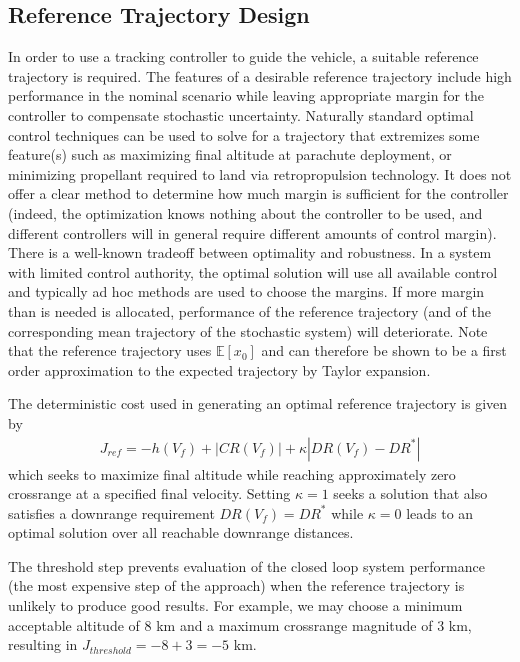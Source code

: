 \documentclass[10pt,a4paper]{article}
\begin{document}
		

	\subsection{Reference Trajectory Design}
	In order to use a tracking controller to guide the vehicle, a suitable reference trajectory is required. The features of a desirable reference trajectory include high performance in the nominal scenario while leaving appropriate margin for the controller to compensate stochastic uncertainty. Naturally standard optimal control techniques can be used to solve for a trajectory that extremizes some feature(s) such as maximizing final altitude at parachute deployment, or minimizing propellant required to land via retropropulsion technology. It does not offer a clear method to determine how much margin is sufficient for the controller (indeed, the optimization knows nothing about the controller to be used, and different controllers will in general require different amounts of control margin). There is a well-known tradeoff between optimality and robustness. In a system with limited control authority, the optimal solution will use all available control and typically ad hoc methods are used to choose the margins. If more margin than is needed is allocated, performance of the reference trajectory (and of the corresponding mean trajectory of the stochastic system) will deteriorate. Note that the reference trajectory uses $ \mathbb{E}[x_0] $ and can therefore be shown to be a first order approximation to the expected trajectory by Taylor expansion.
	
	The deterministic cost used in generating an optimal reference trajectory is given by 
	\begin{align}
	J_{ref} = -h(V_f) + |CR(V_f)| + \kappa|DR(V_f)-DR^*| \label{eq_cost_deterministic}
	\end{align}
	which seeks to maximize final altitude while reaching approximately zero crossrange at a specified final velocity. Setting $\kappa=1$ seeks a solution that also satisfies a downrange requirement $DR(V_f)=DR^*$ while $\kappa=0$ leads to an optimal solution over all reachable downrange distances. 
	
	 The threshold step prevents evaluation of the closed loop system performance (the most expensive step of the approach) when the reference trajectory is unlikely to produce good results. For example, we may choose a minimum acceptable altitude of 8 km and a maximum crossrange magnitude of 3 km, resulting in $ J_{threshold} = -8 + 3 = -5$ km.
			
\end{document}
